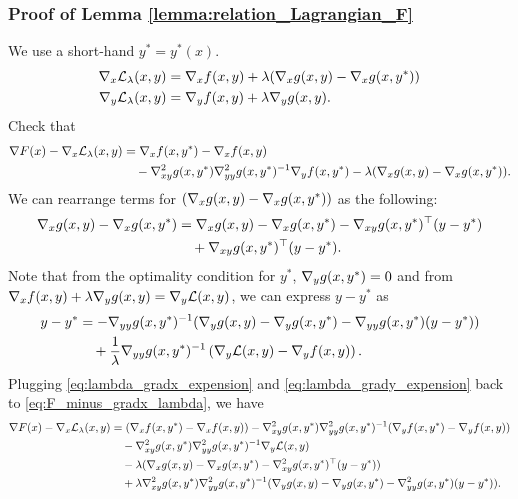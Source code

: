 \subsubsection{Proof of Lemma \ref{lemma:relation_Lagrangian_F}}
We use a short-hand $y^* = y^*(x)$.
\begin{align*}
    \nabla_x \mathcal{L}_\lambda(x,y) &= \nabla_x f(x, y) + \lambda (\nabla_x g(x,y) - \nabla_x g(x, y^*)) \\
    \nabla_y \mathcal{L}_\lambda(x,y) &= \nabla_y f(x, y) + \lambda \nabla_y g(x,y).
\end{align*}
Check that 
\begin{align}
    \nabla F(x) - \nabla_x \mathcal{L}_\lambda(x,y) &= \nabla_x f(x,y^*) - \nabla_x f(x,y) \nonumber \\
    &\quad - \nabla_{xy}^2 g(x,y^*) \nabla_{yy}^{2} g(x,y^*)^{-1} \nabla_y f(x,y^*) - \lambda (\nabla_x g(x,y) - \nabla_x g(x, y^*)).  \label{eq:F_minus_gradx_lambda}
\end{align}
We can rearrange terms for $(\nabla_x g(x,y) - \nabla_x g(x, y^*))$ as the following:
\begin{align}
    \nabla_x g(x,y) - \nabla_x g(x, y^*) &= \nabla_x g(x,y) - \nabla_x g(x, y^*) - \nabla_{xy} g(x,y^*)^\top (y-y^*) \nonumber \\
    &\quad + \nabla_{xy} g(x,y^*)^\top (y-y^*). \label{eq:lambda_gradx_expension}
\end{align}
Note that from the optimality condition for $y^*$, $\nabla_{y} g(x,y^*)=0$ and from $\nabla_x f(x,y) + \lambda \nabla_y g(x,y) = \nabla_y \mathcal{L}(x,y)$, we can express $y - y^*$ as
\begin{align}
    y-y^* &= -\nabla_{yy} g(x,y^*)^{-1} (\nabla_y g(x,y) - \nabla_y g(x,y^*) - \nabla_{yy} g(x,y^*) (y-y^*)) \nonumber \\
    &\quad + \frac{1}{\lambda} \nabla_{yy} g(x,y^*)^{-1} \left(\nabla_y \mathcal{L}(x,y) - \nabla_y f(x,y)\right). \label{eq:lambda_grady_expension}
\end{align}
Plugging \eqref{eq:lambda_gradx_expension} and \eqref{eq:lambda_grady_expension} back to \eqref{eq:F_minus_gradx_lambda}, we have
\begin{align*}
    \nabla F(x) - \nabla_x \mathcal{L}_\lambda(x,y) &= (\nabla_x f(x,y^*) - \nabla_x f(x,y)) - \nabla_{xy}^2 g(x,y^*) \nabla_{yy}^{2} g(x,y^*)^{-1} (\nabla_y f(x,y^*) - \nabla_y f(x,y)) \\
    &\quad - \nabla_{xy}^2 g(x,y^*) \nabla_{yy}^{2} g(x,y^*)^{-1} \nabla_y \mathcal{L}(x,y) \\
    &\quad - \lambda (\nabla_x g(x,y) - \nabla_x g(x, y^*) - \nabla_{xy}^2 g(x,y^*)^\top (y-y^*)) \\
    &\quad + \lambda \nabla_{xy}^2 g(x,y^*) \nabla_{yy}^2 g(x,y^*)^{-1} (\nabla_y g(x,y) - \nabla_y g(x,y^*) - \nabla_{yy}^2 g(x,y^*) (y-y^*)).
\end{align*}

